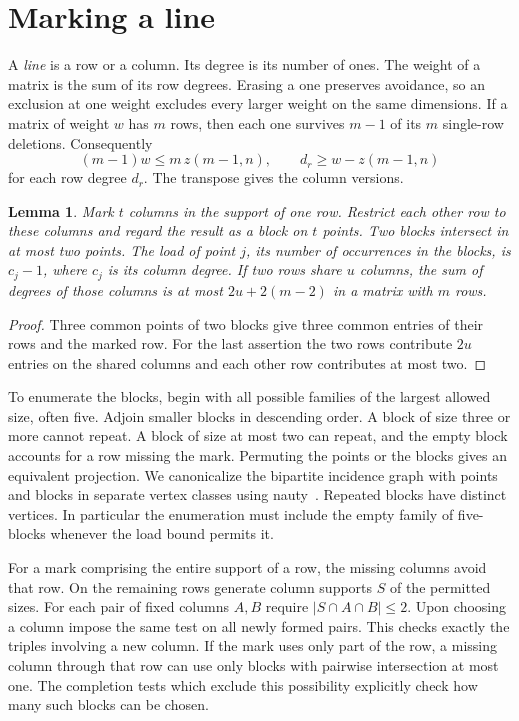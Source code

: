 \documentclass[11pt]{article}
\newtheorem{lemma}[theorem]{Lemma}
\begin{document}
\section{Marking a line}\label{sec:mark}
A \emph{line} is a row or a column. Its degree is its number of ones.
The weight of a matrix is the sum of its row degrees. Erasing a one
preserves avoidance, so an exclusion at one weight excludes every larger
weight on the same dimensions. If a matrix of weight $w$ has $m$ rows,
then each one survives $m-1$ of its $m$ single-row deletions. Consequently
\begin{equation}\label{eq:delete}
(m-1)w\le m\,z(m-1,n),\qquad d_r\ge w-z(m-1,n)
\end{equation}
for each row degree $d_r$. The transpose gives the column versions.

\begin{lemma}\label{lem:mark}
Mark $t$ columns in the support of one row. Restrict each other row to
these columns and regard the result as a block on $t$ points. Two blocks
intersect in at most two points. The load of point $j$, its number of
occurrences in the blocks, is $c_j-1$, where $c_j$ is its column degree.
If two rows share $u$ columns, the sum of degrees of those columns is
at most $2u+2(m-2)$ in a matrix with $m$ rows.
\end{lemma}
\begin{proof}
Three common points of two blocks give three common entries of their
rows and the marked row. For the last assertion the two rows contribute
$2u$ entries on the shared columns and each other row contributes at most
two.
\end{proof}

To enumerate the blocks, begin with all possible families of the largest
allowed size, often five. Adjoin smaller blocks in descending order.
A block of size three or more cannot repeat. A block of size at most two
can repeat, and the empty block accounts for a row missing the mark.
Permuting the points or the blocks gives an equivalent projection. We
canonicalize the bipartite incidence graph with points and blocks in
separate vertex classes using nauty~\cite{nauty}. Repeated blocks have
distinct vertices. In particular the enumeration must include the empty
family of five-blocks whenever the load bound permits it.

For a mark comprising the entire support of a row, the missing columns
avoid that row. On the remaining rows generate column supports $S$ of the
permitted sizes. For each pair of fixed columns $A,B$ require
$|S\cap A\cap B|\le2$. Upon choosing a column impose the same test on all
newly formed pairs. This checks exactly the triples involving a new
column. If the mark uses only part of the row, a missing column through
that row can use only blocks with pairwise intersection at most one.
The completion tests which exclude this possibility explicitly check how
many such blocks can be chosen.
\end{document}
